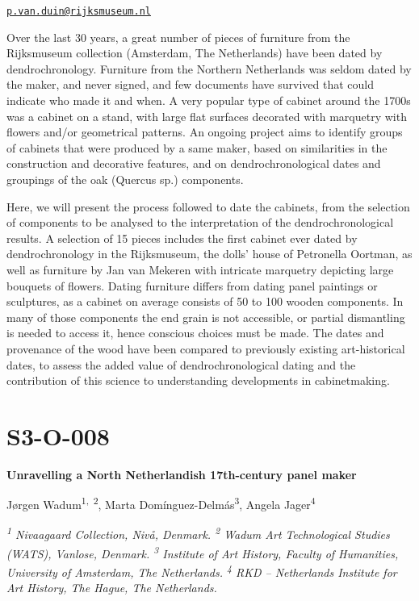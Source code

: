 \documentclass[
]{book}
\begin{document}
\href{mailto:p.van.duin@rijksmuseum.nl}{\nolinkurl{p.van.duin@rijksmuseum.nl}}

Over the last 30 years, a great number of pieces of furniture from the Rijksmuseum collection (Amsterdam, The Netherlands) have been dated by dendrochronology. Furniture from the Northern Netherlands was seldom dated by the maker, and never signed, and few documents have survived that could indicate who made it and when. A very popular type of cabinet around the 1700s was a cabinet on a stand, with large flat surfaces decorated with marquetry with flowers and/or geometrical patterns. An ongoing project aims to identify groups of cabinets that were produced by a same maker, based on similarities in the construction and decorative features, and on dendrochronological dates and groupings of the oak (Quercus sp.) components.

Here, we will present the process followed to date the cabinets, from the selection of components to be analysed to the interpretation of the dendrochronological results. A selection of 15 pieces includes the first cabinet ever dated by dendrochronology in the Rijksmuseum, the dolls' house of Petronella Oortman, as well as furniture by Jan van Mekeren with intricate marquetry depicting large bouquets of flowers. Dating furniture differs from dating panel paintings or sculptures, as a cabinet on average consists of 50 to 100 wooden components. In many of those components the end grain is not accessible, or partial dismantling is needed to access it, hence conscious choices must be made. The dates and provenance of the wood have been compared to previously existing art-historical dates, to assess the added value of dendrochronological dating and the contribution of this science to understanding developments in cabinetmaking.

\hypertarget{s3-o-008}{%
\section*{S3-O-008}\label{s3-o-008}}

\textbf{Unravelling a North Netherlandish 17th-century panel maker}

Jørgen Wadum\textsuperscript{1,~2}, Marta Domínguez-Delmás\textsuperscript{3}, Angela Jager\textsuperscript{4}

\emph{\textsuperscript{1} Nivaagaard Collection, Nivå, Denmark. \textsuperscript{2} Wadum Art Technological Studies (WATS), Vanlose, Denmark. \textsuperscript{3} Institute of Art History, Faculty of Humanities, University of Amsterdam, The Netherlands. \textsuperscript{4} RKD -- Netherlands Institute for Art History, The Hague, The Netherlands.}
\end{document}
